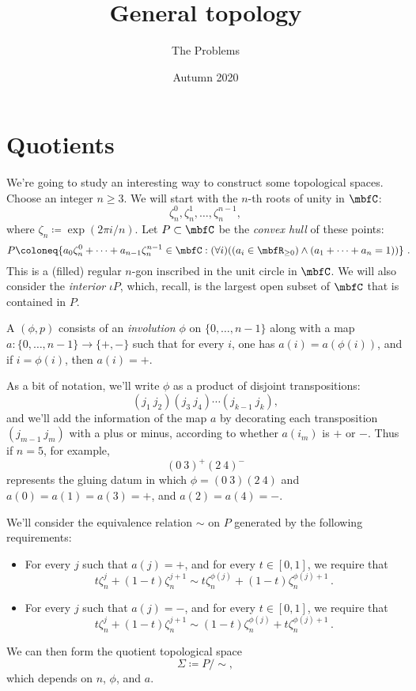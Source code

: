 \documentclass[a4paper,twoside,nols,nobib]{tufte-handout}
\title{General topology}
\author{The Problems}
\date{Autumn 2020}
\begin{document}
\maketitle

\section*{Quotients}

\begin{ntn*}
	We're going to study an interesting way to construct some topological spaces.
	Choose an integer $n \geq 3$.
	We will start with the $n$-th roots of unity in $\CC$:
	\[
		\zeta_n^0, \zeta_n^1, \dots, \zeta_n^{n-1} \comma
	\]
	where $\zeta_n \coloneq \exp(2\pi i/n)$.
	Let $P \subset \CC$ be the \emph{convex hull} of these points:
	\[
		P \coloneq \{ a_0\zeta_n^0+\cdots+a_{n-1}\zeta_n^{n-1} \in \CC : (\forall i)((a_i \in \RR_{\geq 0}) \wedge (a_1+\cdots+a_n=1)) \} \period
	\]
	This is a (filled) regular $n$-gon inscribed in the unit circle in $\CC$.
	We will also consider the \emph{interior} $\iota P$, which, recall, is the largest open subset of $\CC$ that is contained in $P$.

	A  $(\phi, p)$ consists of an \emph{involution}%
	$\phi$ on $\{0,\dots,n-1\}$ along with a map $a \colon \{0,\dots,n-1\} \to \{+,-\}$ such that for every $i$, one has $a(i) = a(\phi(i))$, and if $i = \phi(i)$, then $a(i) = +$.

	As a bit of notation, we'll write $\phi$ as a product of disjoint transpositions:%
	\[
		(j_1\ j_2)(j_3\ j_4) \cdots (j_{k-1}\ j_k) \comma
	\]
	and we'll add the information of the map $a$ by decorating each transposition $(j_{m-1}\ j_m)$ with a plus or minus, according to whether $a(i_m) $ is $+$ or $-$.
	Thus if $n=5$, for example,
	\[
		(0\ 3)^+(2\ 4)^-
	\]
	represents the gluing datum in which $\phi = (0\ 3)(2\ 4) $ and $a(0)=a(1)=a(3)=+$, and $a(2)=a(4) = -$.

	We'll consider the equivalence relation $\sim$ on $P$ generated by the following requirements:
	\begin{itemize}
		\item For every $j$ such that $a(j) = +$, and for every $t \in [0,1]$, we require that
			\[
				t\zeta_n^j + (1-t)\zeta_n^{j+1} \sim t \zeta_n^{\phi(j)} + (1-t) \zeta_n^{\phi(j)+1} \period
			\]
		\item For every $j$ such that $a(j) = -$, and for every $t \in [0,1]$, we require that
			\[
				t\zeta_n^j + (1-t)\zeta_n^{j+1} \sim (1-t) \zeta_n^{\phi(j)} + t \zeta_n^{\phi(j)+1} \period
			\]
	\end{itemize}
	We can then form the quotient topological space%
	\[
		\Sigma \coloneq P/{\sim} \comma
	\]
	which depends on $n$, $\phi$, and $a$.
\end{ntn*}
\end{document}
